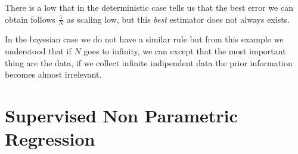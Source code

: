 There is a low that in the deterministic case tells us that the best error we can obtain follows $\frac{1}{N}$ as scaling low, but this \textit{best} estimator does not always exists.

In the bayesian case we do not have a similar rule but from this example we understood that if $N$ goes to infinity, we can except that the most important thing are the data, if we collect infinite indipendent data the prior information becomes almost irrelevant.

\section{Supervised Non Parametric Regression}
%
%
%
%
%
%
%
%
%
%
%
%
%
